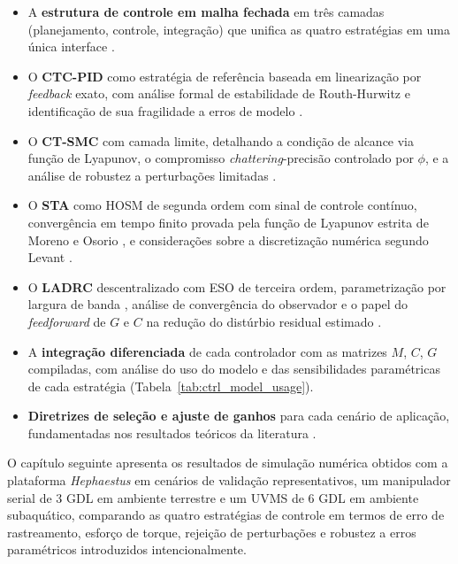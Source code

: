 \begin{itemize}
    \item A \textbf{estrutura de controle em malha fechada} em três camadas (planejamento, controle, integração) que unifica as quatro estratégias em uma única interface \cite{siciliano2009robotics, craig1989introduction}.

    \item O \textbf{CTC-PID} como estratégia de referência baseada em linearização por \textit{feedback} exato, com análise formal de estabilidade de Routh-Hurwitz e identificação de sua fragilidade a erros de modelo \cite{spong2020robot, isidori1985nonlinear, astrom1995theory}.

    \item O \textbf{CT-SMC} com camada limite, detalhando a condição de alcance via função de Lyapunov, o compromisso \textit{chattering}-precisão controlado por $\phi$, e a análise de robustez a perturbações limitadas \cite{slotine1991applied, burton1986continuous, edwards1998sliding, utkin2017sliding}.

    \item O \textbf{STA} como HOSM de segunda ordem com sinal de controle contínuo, convergência em tempo finito provada pela função de Lyapunov estrita de Moreno e Osorio \cite{moreno2012strict}, e considerações sobre a discretização numérica segundo Levant \cite{levant2010chattering}.

    \item O \textbf{LADRC} descentralizado com ESO de terceira ordem, parametrização por largura de banda \cite{gao2003scaling}, análise de convergência do observador \cite{zheng2010practical} e o papel do \textit{feedforward} de $G$ e $C$ na redução do distúrbio residual estimado \cite{han2009pid, huang2014active}.

    \item A \textbf{integração diferenciada} de cada controlador com as matrizes $M$, $C$, $G$ compiladas, com análise do uso do modelo e das sensibilidades paramétricas de cada estratégia (Tabela~\ref{tab:ctrl_model_usage}).

    \item \textbf{Diretrizes de seleção e ajuste de ganhos} para cada cenário de aplicação, fundamentadas nos resultados teóricos da literatura \cite{astrom1995theory, slotine1991applied, gao2003scaling, moreno2012strict}.
\end{itemize}

O capítulo seguinte apresenta os resultados de simulação numérica obtidos com a plataforma \textit{Hephaestus} em cenários de validação representativos, um manipulador serial de 3 GDL em ambiente terrestre e um UVMS de 6 GDL em ambiente subaquático, comparando as quatro estratégias de controle em termos de erro de rastreamento, esforço de torque, rejeição de perturbações e robustez a erros paramétricos introduzidos intencionalmente.
